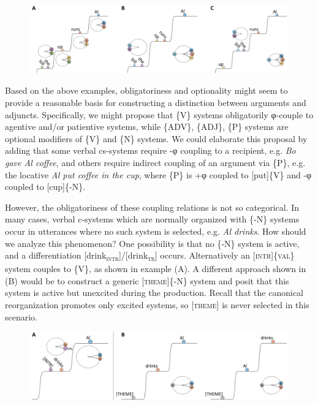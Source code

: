   
\begin{figure}
\includegraphics[width=\textwidth]{figures/Tilsen-img85.png}
\caption{\missingcaption}
\label{fig:}
\end{figure}
 

  Based on the above examples, obligatoriness and optionality might seem to provide a reasonable basis for constructing a distinction between arguments and adjuncts. Specifically, we might propose that \{V\} systems obligatorily φ-couple to agentive and/or patientive systems, while \{ADV\}, \{ADJ\}, \{P\} systems are optional modifiers of \{V\} and \{N\} systems. We could elaborate this proposal by adding that some verbal cs-systems require -φ coupling to a recipient, e.g. \textit{Bo gave Al coffee}, and others require indirect coupling of an argument via \{P\}, e.g. the locative \textit{Al put coffee in the cup}, where \{P\} is +φ coupled to [put]\{V\} and -φ coupled to [cup]\{-N\}.

  However, the obligatoriness of these coupling relations is not so categorical. In many cases, verbal c-systems which are normally organized with \{-N\} systems occur in utterances where no such system is selected, e.g. \textit{Al drinks}. How should we analyze this phenomenon? One possibility is that no \{-N\} system is active, and a differentiation [drink\textsc{\textsubscript{intr}}]/[drink\textsc{\textsubscript{tr}}] occurs. Alternatively an [\textsc{intr}]\{\textsc{val}\} system couples to \{V\}, as shown in example (A). A different approach shown in (B) would be to construct a generic [\textsc{theme}]\{-N\} system and posit that this system is active but unexcited during the production. Recall that the canonical reorganization promotes only excited systems, so [\textsc{theme}] is never selected in this scenario. 

  
\begin{figure}
\includegraphics[width=\textwidth]{figures/Tilsen-img86.png}
\caption{\missingcaption}
\label{fig:}
\end{figure}
 

